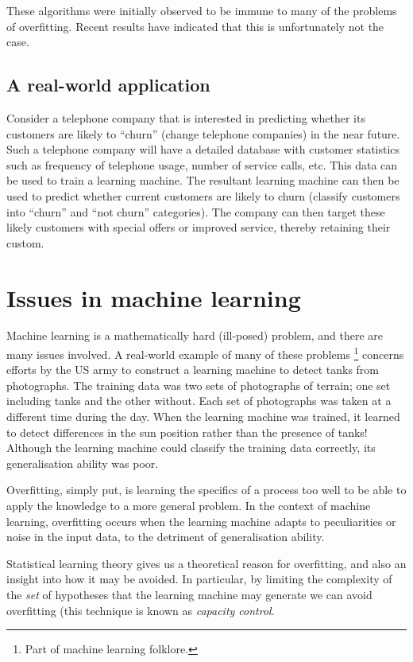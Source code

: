 These algorithms were initially observed to be immune to many of the
problems of overfitting.  Recent results have indicated that this is
unfortunately not the case.

\subsection{A real-world application}
\label{sec:churn example}

Consider a telephone company that is interested in predicting whether
its customers are likely to ``churn'' (change telephone companies) in
the near future.  Such a telephone company will have a detailed
database with customer statistics such as frequency of telephone
usage, number of service calls, etc.  This data can be used to train a
learning machine.   The resultant learning machine can then be used to
predict whether current customers are likely to churn (classify
customers into ``churn'' and ``not churn'' categories).  The company
can then target these likely customers with special offers or improved
service, thereby retaining their custom.

\section{Issues in machine learning}

Machine learning is a mathematically hard (ill-posed) problem, and
there are many issues involved.  A real-world example of many of these
problems%
\footnote{Part of machine learning folklore.}
concerns efforts by the US army to construct a learning machine to
detect tanks from photographs.  The training data was two sets of
photographs of terrain; one set including tanks and the other without.
Each set of  photographs was taken at a different time during the day.
When the learning machine was trained, it learned to detect
differences in the sun position rather than the presence of tanks!
Although the learning machine could classify the training data
correctly, its generalisation ability was poor.

Overfitting, simply put, is learning the specifics of a process too
well to be able to apply the knowledge to a more general problem.  In
the context of machine learning, overfitting occurs when the learning
machine adapts to peculiarities or noise in the input data, to the
detriment of generalisation ability.

Statistical learning theory gives us a theoretical reason for
overfitting, and also an insight into how it may be avoided.  In
particular, by limiting the complexity of the \emph{set} of hypotheses
that the learning machine may generate we can avoid overfitting (this
technique is known as \emph{capacity control}.


